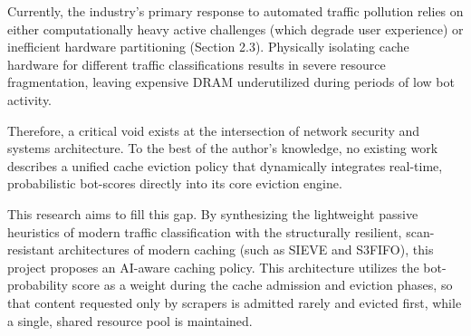 Currently, the industry's primary response to automated traffic pollution relies on either computationally heavy active challenges (which degrade user experience) or inefficient hardware partitioning (Section 2.3). Physically isolating cache hardware for different traffic classifications results in severe resource fragmentation, leaving expensive DRAM underutilized during periods of low bot activity.

Therefore, a critical void exists at the intersection of network security and systems architecture. To the best of the author's knowledge, no existing work describes a unified cache eviction policy that dynamically integrates real-time, probabilistic bot-scores directly into its core eviction engine. 

This research aims to fill this gap. By synthesizing the lightweight passive heuristics of modern traffic classification with the structurally resilient, scan-resistant architectures of modern caching (such as SIEVE and S3FIFO), this project proposes an AI-aware caching policy. This architecture utilizes the bot-probability score as a weight during the cache admission and eviction phases, so that content requested only by scrapers is admitted rarely and evicted first, while a single, shared resource pool is maintained.